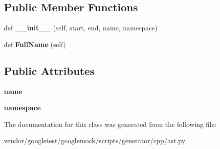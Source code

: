 \subsection*{Public Member Functions}
\begin{DoxyCompactItemize}
\item 
def {\bfseries \+\_\+\+\_\+init\+\_\+\+\_\+} (self, start, end, name, namespace)\hypertarget{classcpp_1_1ast_1_1__GenericDeclaration_afde72751e20708a7802eb7707d23bc3c}{}\label{classcpp_1_1ast_1_1__GenericDeclaration_afde72751e20708a7802eb7707d23bc3c}

\item 
def {\bfseries Full\+Name} (self)\hypertarget{classcpp_1_1ast_1_1__GenericDeclaration_a1437d31271ea8cda62da22e2ce427a85}{}\label{classcpp_1_1ast_1_1__GenericDeclaration_a1437d31271ea8cda62da22e2ce427a85}

\end{DoxyCompactItemize}
\subsection*{Public Attributes}
\begin{DoxyCompactItemize}
\item 
{\bfseries name}\hypertarget{classcpp_1_1ast_1_1__GenericDeclaration_af774f4729dfd78d0538a6782fe8514c1}{}\label{classcpp_1_1ast_1_1__GenericDeclaration_af774f4729dfd78d0538a6782fe8514c1}

\item 
{\bfseries namespace}\hypertarget{classcpp_1_1ast_1_1__GenericDeclaration_a8aee3f11b37449d54b42a78e0a689f46}{}\label{classcpp_1_1ast_1_1__GenericDeclaration_a8aee3f11b37449d54b42a78e0a689f46}

\end{DoxyCompactItemize}


The documentation for this class was generated from the following file\+:\begin{DoxyCompactItemize}
\item 
vendor/googletest/googlemock/scripts/generator/cpp/ast.\+py\end{DoxyCompactItemize}
